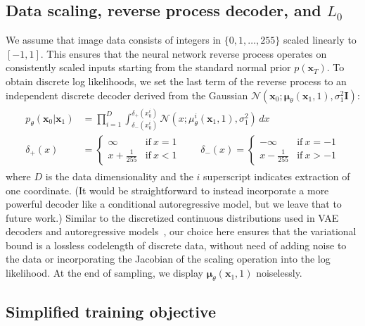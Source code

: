 \documentclass{article}
\newcommand{\bI}{\mathbf{I}}
\newcommand{\bx}{\mathbf{x}}
\newcommand{\bmu}{{\boldsymbol{\mu}}}
\begin{document}
\subsection[Data scaling and reverse process decoder]{Data scaling, reverse process decoder, and $L_0$}
We assume that image data consists of integers in $\{ 0, 1, \dotsc, 255\}$ scaled linearly to $[-1, 1]$. This ensures that the neural network reverse process operates on consistently scaled inputs starting from the standard normal prior $p(\bx_T)$.
To obtain discrete log likelihoods, we set the last term of the reverse process to an independent discrete decoder derived from the Gaussian $\mathcal{N}(\bx_0 ; \bmu_\theta(\bx_1, 1), \sigma_1^2 \bI)$:
\begin{align}\begin{split}
p_\theta(\bx_0 | \bx_1) &= \prod_{i=1}^D \int_{\delta_{-}(x_0^i)}^{\delta_{+}(x_0^i)} \mathcal{N}(x; \mu_\theta^i(\bx_1, 1), \sigma_1^2) \, dx \label{eq:discrete_decoder} \\
\delta_{+}(x) &= \begin{cases}
\infty & \text{if}\ x=1 \\
x+\frac{1}{255} & \text{if}\ x < 1
\end{cases}
\qquad \delta_{-}(x) = \begin{cases}
-\infty & \text{if}\ x=-1 \\
x-\frac{1}{255} & \text{if}\ x > -1
\end{cases}
\end{split}\end{align}
where $D$ is the data dimensionality and the $i$ superscript indicates extraction of one coordinate.
(It would be straightforward to instead incorporate a more powerful decoder like a conditional autoregressive model, but we leave that to future work.) Similar to the discretized continuous distributions used in VAE decoders and autoregressive models~\citep{kingma2016improved,salimans2017pixelcnn++}, our choice here ensures that the variational bound is a lossless codelength of discrete data, without need of adding noise to the data or incorporating the Jacobian of the scaling operation into the log likelihood. At the end of sampling, we display $\bmu_\theta(\bx_1,1)$ noiselessly.

\subsection{Simplified training objective}
\label{sec:simplified_training_objective}
\end{document}
